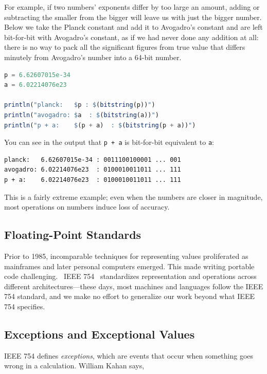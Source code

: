 \documentclass{juliacon}
\begin{document}
For example, if two numbers' exponents differ by too large an amount, adding or subtracting the smaller from the bigger will leave us with just the bigger number.
Below we take the Planck constant and add it to Avogadro's constant and are left bit-for-bit with Avogadro's constant, as if we had never done any addition at all: there is no way to pack all the significant figures from true value that differs minutely from Avogadro's number into a 64-bit \fp{} number.

\begin{lstlisting}[language = Julia]
p = 6.62607015e-34
a = 6.02214076e23

println("planck:   $p : $(bitstring(p))")
println("avogadro: $a  : $(bitstring(a))")
println("p + a:    $(p + a)  : $(bitstring(p + a))")
\end{lstlisting}

You can see in the output that \texttt{p + a} is bit-for-bit equivalent to \texttt{a}:

\begin{lstlisting}
planck:   6.62607015e-34 : 0011100100001 ... 001
avogadro: 6.02214076e23  : 0100010011011 ... 111
p + a:    6.02214076e23  : 0100010011011 ... 111
\end{lstlisting}

This is a fairly extreme example; even when the numbers are closer in magnitude, most operations on \fp{} numbers induce loss of accuracy.

\subsection{Floating-Point Standards}

Prior to 1985, incomparable techniques for representing \fp{} values proliferated as mainframes and later personal computers emerged.
This made writing portable \fp{} code challenging.~\cite{houghIEEEStandard7542019}
IEEE 754~\cite{IEEEStandardBinary1985} standardizes \fp{} representation and operations across different architectures---these days, most machines and languages follow the IEEE 754 standard, and we make no effort to generalize our work beyond what IEEE 754 specifies.

\subsection{Exceptions and Exceptional Values}

IEEE 754 defines \emph{\fp{} exceptions}, which are events that occur when something goes wrong in a calculation.
William Kahan says,
\end{document}
